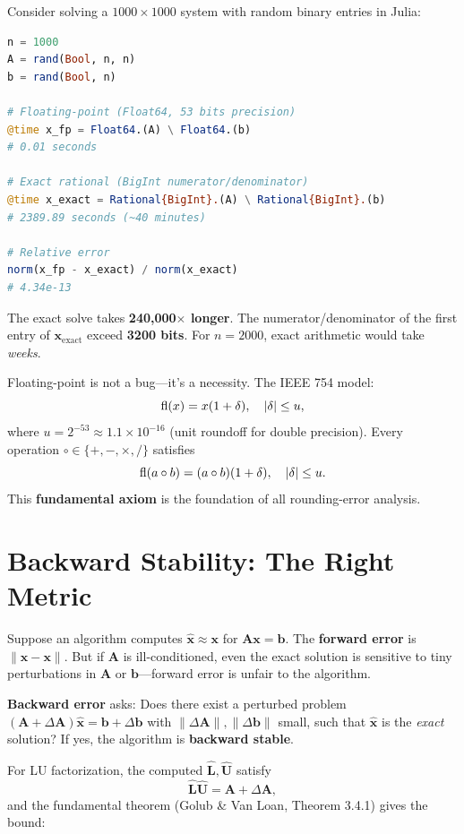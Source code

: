 \begin{example}
Consider solving a $1000 \times 1000$ system with random binary entries in Julia:
\begin{lstlisting}[language=Julia,caption=Exact vs. floating-point solve]
n = 1000
A = rand(Bool, n, n)
b = rand(Bool, n)

# Floating-point (Float64, 53 bits precision)
@time x_fp = Float64.(A) \ Float64.(b)
# 0.01 seconds

# Exact rational (BigInt numerator/denominator)
@time x_exact = Rational{BigInt}.(A) \ Rational{BigInt}.(b)
# 2389.89 seconds (~40 minutes)

# Relative error
norm(x_fp - x_exact) / norm(x_exact)
# 4.34e-13
\end{lstlisting}
The exact solve takes \textbf{240,000$\times$ longer}. The numerator/denominator of the first entry of $\bm{x}_{\text{exact}}$ exceed \textbf{3200 bits}. For $n=2000$, exact arithmetic would take \emph{weeks}.
\end{example}

Floating-point is not a bug---it's a necessity. The IEEE 754 model:
\[
\operatorname{fl}(x) = x(1 + \delta),\quad |\delta| \le u,
\]
where $u = 2^{-53} \approx 1.1 \times 10^{-16}$ (unit roundoff for double precision). Every operation $\circ \in \{+,-,\times,/\}$ satisfies
\[
\operatorname{fl}(a \circ b) = (a \circ b)(1 + \delta),\quad |\delta| \le u.
\]
This \textbf{fundamental axiom} is the foundation of all rounding-error analysis.

\section{Backward Stability: The Right Metric}
\label{sec:ge:backward}

Suppose an algorithm computes $\hat{\bm{x}} \approx \bm{x}$ for $\bm{A}\bm{x} = \bm{b}$. The \textbf{forward error} is $\|\hat{\bm{x}} - \bm{x}\|$. But if $\bm{A}$ is ill-conditioned, even the exact solution is sensitive to tiny perturbations in $\bm{A}$ or $\bm{b}$---forward error is unfair to the algorithm.

\textbf{Backward error} asks: Does there exist a perturbed problem $(\bm{A}+\Delta\bm{A})\hat{\bm{x}} = \bm{b}+\Delta\bm{b}$ with $\|\Delta\bm{A}\|, \|\Delta\bm{b}\|$ small, such that $\hat{\bm{x}}$ is the \emph{exact} solution? If yes, the algorithm is \textbf{backward stable}.

For LU factorization, the computed $\hat{\bm{L}}, \hat{\bm{U}}$ satisfy
\[
\hat{\bm{L}}\hat{\bm{U}} = \bm{A} + \Delta\bm{A},
\]
and the fundamental theorem (Golub \& Van Loan, Theorem 3.4.1) gives the bound:

